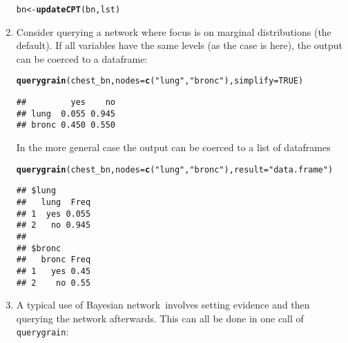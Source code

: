 \documentclass[10pt]{article}\usepackage[]{graphicx}\usepackage[]{xcolor}
\makeatletter
\newcommand{\hlnum}[1]{\textcolor[rgb]{0.686,0.059,0.569}{#1}}%
\newcommand{\hlstr}[1]{\textcolor[rgb]{0.192,0.494,0.8}{#1}}%
\newcommand{\hlstd}[1]{\textcolor[rgb]{0.345,0.345,0.345}{#1}}%
\newcommand{\hlkwb}[1]{\textcolor[rgb]{0.69,0.353,0.396}{#1}}%
\newcommand{\hlkwc}[1]{\textcolor[rgb]{0.333,0.667,0.333}{#1}}%
\newcommand{\hlkwd}[1]{\textcolor[rgb]{0.737,0.353,0.396}{\textbf{#1}}}%
\newenvironment{kframe}{%
 \def\at@end@of@kframe{}%
 \ifinner\ifhmode%
  \def\at@end@of@kframe{\end{minipage}}%
  \begin{minipage}{\columnwidth}%
 \fi\fi%
 \def\FrameCommand##1{\hskip\@totalleftmargin \hskip-\fboxsep
 \colorbox{shadecolor}{##1}\hskip-\fboxsep
     \hskip-\linewidth \hskip-\@totalleftmargin \hskip\columnwidth}%
 \MakeFramed {\advance\hsize-\width
   \@totalleftmargin\z@ \linewidth\hsize
   \@setminipage}}%
 {\par\unskip\endMakeFramed%
 \at@end@of@kframe}
\newenvironment{knitrout}{}{} %
\def\code#1{{\texttt{#1}}}
\def\bn{Bayesian network}
\makeatother
\begin{document}
\begin{enumerate}
\begin{knitrout}
\begin{kframe}
\begin{alltt}
\hlstd{bn} \hlkwb{<-} \hlkwd{updateCPT}\hlstd{(bn, lst)}
\end{alltt}
\end{kframe}
\end{knitrout}

\item Consider querying a network where focus is on 
  marginal distributions (the default). If all variables have the same
  levels (as the case is here), the output can be coerced to a
  dataframe:

\begin{knitrout}
\color{fgcolor}\begin{kframe}
\begin{alltt}
\hlkwd{querygrain}\hlstd{(chest_bn,} \hlkwc{nodes}\hlstd{=}\hlkwd{c}\hlstd{(}\hlstr{"lung"}\hlstd{,} \hlstr{"bronc"}\hlstd{),} \hlkwc{simplify} \hlstd{=} \hlnum{TRUE}\hlstd{)}
\end{alltt}
\begin{verbatim}
##         yes    no
## lung  0.055 0.945
## bronc 0.450 0.550
\end{verbatim}
\end{kframe}
\end{knitrout}

In the more general case the output can be coerced to a list of dataframes
\begin{knitrout}
\color{fgcolor}\begin{kframe}
\begin{alltt}
\hlkwd{querygrain}\hlstd{(chest_bn,} \hlkwc{nodes}\hlstd{=}\hlkwd{c}\hlstd{(}\hlstr{"lung"}\hlstd{,} \hlstr{"bronc"}\hlstd{),} \hlkwc{result}\hlstd{=}\hlstr{"data.frame"}\hlstd{)}
\end{alltt}
\begin{verbatim}
## $lung
##   lung  Freq
## 1  yes 0.055
## 2   no 0.945
## 
## $bronc
##   bronc Freq
## 1   yes 0.45
## 2    no 0.55
\end{verbatim}
\end{kframe}
\end{knitrout}

\item A typical use of \bn\ involves setting evidence and then querying the network afterwards. This can all be done in one call of \code{querygrain}:


\end{enumerate}
\end{document}

